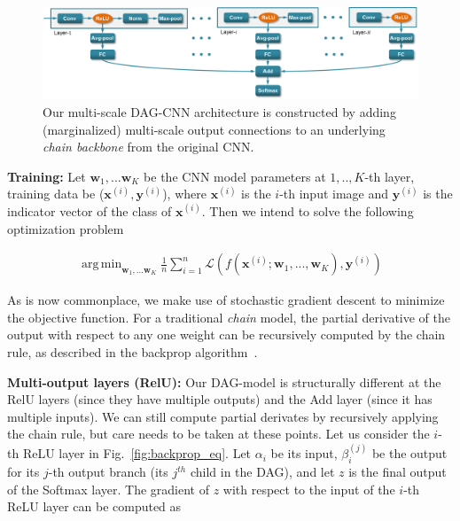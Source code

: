 \documentclass[10pt,twocolumn,letterpaper]{article}
\DeclareMathOperator*{\argmin}{arg\,min}
\begin{document}

\begin{figure}[t!]
\centering
	\includegraphics[width=\textwidth]{fig/fig_model.png}
\caption{Our multi-scale DAG-CNN architecture is constructed by adding (marginalized) multi-scale output connections to an underlying {\em chain backbone} from the original CNN.}
\label{fig:model}
\end{figure}

{\bf Training:} Let $\textbf{w}_1,...\textbf{w}_K$ be the CNN model parameters at $1,..,K$-th layer, training data be ($\textbf{x}^{(i)},\textbf{y}^{(i)}$), where $\textbf{x}^{(i)}$ is the $i$-th input image and $\textbf{y}^{(i)}$ is the indicator vector of the class of $\textbf{x}^{(i)}$. Then we intend to solve the following optimization problem

\begin{align}
\argmin_{\textbf{w}_1,...\textbf{w}_K} \frac{1}{n}\sum_{i=1}^{n} \mathcal{L}(f(\textbf{x}^{(i)};\textbf{w}_1,...,\textbf{w}_K),\textbf{y}^{(i)})
\end{align}

As is now commonplace, we make use of stochastic gradient descent to minimize the objective function. For a traditional \textit{chain} model, the partial derivative of the output with respect to any one weight can be recursively computed by the chain rule, as described in the backprop algorithm~\cite{rumelhart1988learning}. 

{\bf Multi-output layers (RelU):} Our DAG-model is structurally different at the RelU layers (since they have multiple outputs) and the Add layer (since it has multiple inputs). We can still compute partial derivates by recursively applying the chain rule, but care needs to be taken at these points. Let us consider the $i$-th ReLU layer in Fig.~\ref{fig:backprop_eq}. Let $\alpha_i$ be its input, $\beta_i^{(j)}$ be the output for its $j$-th output branch (its $j^{th}$ child in the DAG), and let $z$ is the final output of the Softmax layer. The gradient of $z$ with respect to the input of the $i$-th ReLU layer can be computed as
\end{document}
